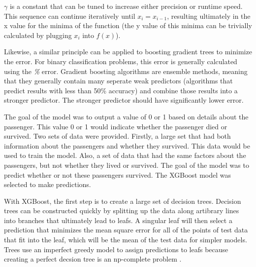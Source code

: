 \documentclass[12pt]{article}
\begin{document}
   $ \gamma $ is a constant that can be tuned to increase either precision or runtime speed. This sequence can continue iteratively until $x_i = x_{i-1}$, resulting ultimately in the x value for the minima of the function (the y value of this minima can be trivially calculated by plugging $x_i$ into $f(x)$).

   Likewise, a similar principle can be applied to boosting gradient trees to minimize the error. For binary classification problems, this error is generally calculated using the \textit{\%} error. Gradient boosting algorithms are ensemble methods, meaning that they generally contain many seperate weak predictors (algorithms that predict results with less than 50\% accuracy) and combine those results into a stronger predictor. The stronger predictor should have significantly lower error.

    The goal of the model was to output a value of 0 or 1 based on details about the passenger. This value 0 or 1 would indicate whether the passenger died or survived. Two sets of data were provided. Firstly, a large set that had both information about the passengers and whether they survived. This data would be used to train the model. Also, a set of data that had the same factors about the passengers, but not whether they lived or survived. The goal of the model was to predict whether or not these passengers survived. The XGBoost model was selected to make predictions.

    With XGBoost, the first step is to create a large set of decision trees. Decision trees can be constructed quickly by splitting up the data along artibrary lines into branches that ultimately lead to leafs. A singular leaf will then select a prediction that minimizes the mean square error for all of the points of test data that fit into the leaf, which will be the mean of the test data for simpler models. Trees use an imperfect greedy model to assign predictions to leafs because creating a perfect decsion tree is an np-complete problem \cite{two}.
\end{document}
